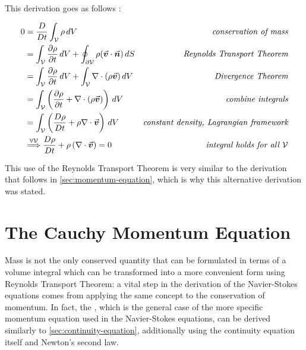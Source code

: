 This derivation goes as follows \autocite*{continuum-intro}:

\begin{align}
    0 & = \frac{D}{Dt} \int_\mathcal{V}\rho\,dV                                                                                & \textit{conservation of mass}                   \\
      & = \int_\mathcal{V} \frac{\partial\rho}{\partial t} \,dV + \oint_{\partial \mathcal{V}} \rho (\vec{\bm{v}}\cdot\vec{\bm{n}}) \,dS & \textit{Reynolds Transport Theorem}             \\
      & = \int_\mathcal{V} \frac{\partial\rho}{\partial t} \,dV + \int_{\mathcal{V}} \nabla \cdot (\rho \vec{\bm{v}}) \,dV          & \textit{Divergence Theorem}                     \\
      & = \int_\mathcal{V} \left(\frac{\partial\rho}{\partial t} + \nabla \cdot (\rho \vec{\bm{v}})\right) \,dV                     & \textit{combine integrals}                      \\
      & = \int_\mathcal{V} \left(\frac{D\rho}{D t} + \rho \nabla \cdot  \vec{\bm{v}}\right) \,dV                                    & \textit{constant density, Lagrangian framework} \\
      & \overset{\forall\mathcal{V}}{\Longrightarrow} \frac{D\rho}{D t} + \rho \left(\nabla \cdot  \vec{\bm{v}}\right) = 0          & \textit{integral holds for all $\mathcal{V}$}
\end{align}

This use of the Reynolds Transport Theorem is very similar to the derivation that follows in \autoref{sec:momentum-equation}, which is why this alternative derivation was stated.

\section{The Cauchy Momentum Equation}\label{sec:momentum-equation}

Mass is not the only conserved quantity that can be formulated in terms of a volume integral which can be transformed into a more convenient form using Reynolds Transport Theorem: a vital step in the derivation of the Navier-Stokes equations comes from applying the same concept to the conservation of momentum. In fact, the , which is the general case of the more specific momentum equation used in the Navier-Stokes equations, can be derived similarly to \autoref{sec:continuity-equation}, additionally using the continuity equation itself and Newton's second law.

